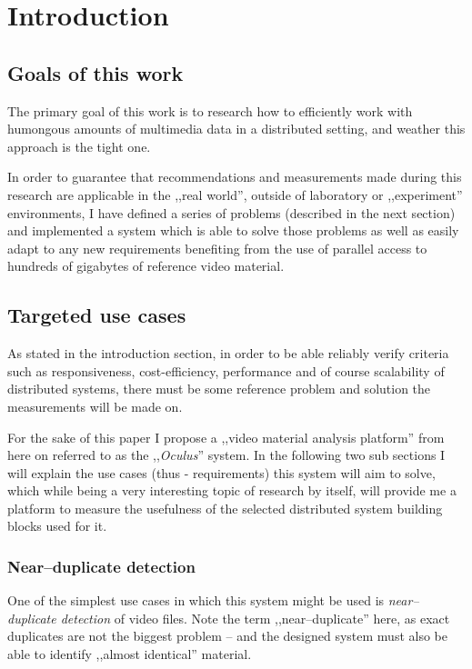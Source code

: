 \chapter{Introduction}



\section{Goals of this work}
The primary goal of this work is to research how to efficiently work with humongous amounts of multimedia data in a distributed setting, and weather this approach is the tight one.

In order to guarantee that recommendations and measurements made during this research are applicable in the ,,real world'', outside of laboratory or ,,experiment'' environments, I have defined a series of problems (described in the next section) and implemented a system which is able to solve those problems as well as easily adapt to any new requirements benefiting from the use of parallel access to hundreds of gigabytes of reference video material.

\section{Targeted use cases}

As stated in the introduction section, in order to be able reliably verify criteria such as responsiveness, cost-efficiency, performance and of course scalability of distributed systems, there must be some reference problem and solution the measurements will be made on. 

For the sake of this paper I propose a ,,video material analysis platform'' from here on referred to as the ,,\textit{Oculus}'' system.
In the following two sub sections I will explain the use cases (thus - requirements) this system will aim to solve, which while being a very interesting 
topic of research by itself, will provide me a platform to measure the usefulness of the selected distributed system building blocks used for it. 

\subsection{Near--duplicate detection}
One of the simplest use cases in which this system might be used is \textit{near--duplicate detection} of video files.
Note the term ,,near--duplicate'' here, as exact duplicates are not the biggest problem -- and the designed system must also be able to identify ,,almost identical'' material.

